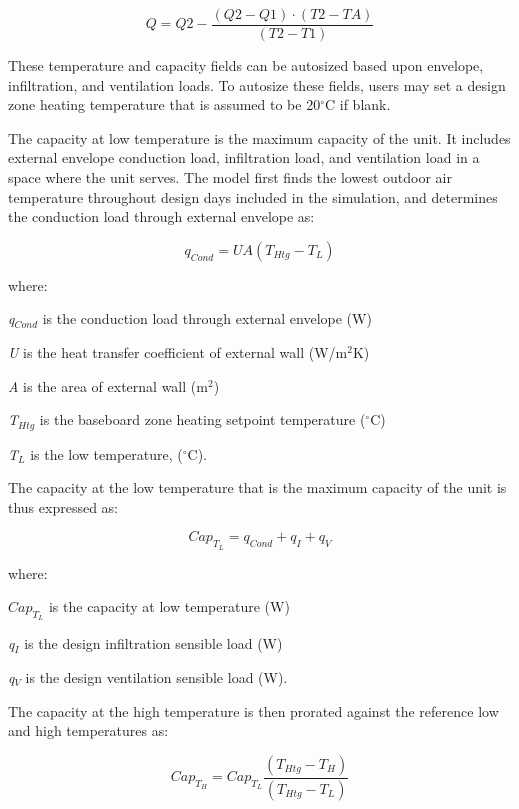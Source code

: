 \begin{equation}
Q = Q2 - \frac{{(Q2 - Q1)\cdot (T2 - TA)}}{{(T2 - T1)}}
\end{equation}

These temperature and capacity fields can be autosized based upon envelope, infiltration, and ventilation loads. To autosize these fields, users may set a design zone heating temperature that is assumed to be 20\(^{\circ}\)C if blank.

The capacity at low temperature is the maximum capacity of the unit. It includes external envelope conduction load, infiltration load, and ventilation load in a space where the unit serves. The model first finds the lowest outdoor air temperature throughout design days included in the simulation, and determines the conduction load through external envelope as:

\begin{equation}
{q_{Cond}} = UA\left( {{T_{Htg}} - {T_L}} \right)
\end{equation}

where:

\emph{q\(_{Cond}\)} is the conduction load through external envelope (W)

\emph{U} is the heat transfer coefficient of external wall (W/m\(^{2}\)K)

\emph{A} is the area of external wall (m\(^{2}\))

\emph{T\(_{Htg}\)} is the baseboard zone heating setpoint temperature (\(^{\circ}\)C)

\emph{T\(_{L}\)} is the low temperature, (\(^{\circ}\)C).

The capacity at the low temperature that is the maximum capacity of the unit is thus expressed as:

\begin{equation}
Ca{p_{{T_L}}} = {q_{Cond}} + {q_I} + {q_V}
\end{equation}

where:

\(Ca{p_{{T_L}}}\) is the capacity at low temperature (W)

\emph{q\(_{I}\)} is the design infiltration sensible load (W)

\emph{q\(_{V}\)} is the design ventilation sensible load (W).

The capacity at the high temperature is then prorated against the reference low and high temperatures as:

\begin{equation}
Ca{p_{{T_H}}} = Ca{p_{{T_L}}}\frac{{\left( {{T_{Htg}} - {T_H}} \right)}}{{\left( {{T_{Htg}} - {T_L}} \right)}}
\end{equation}

